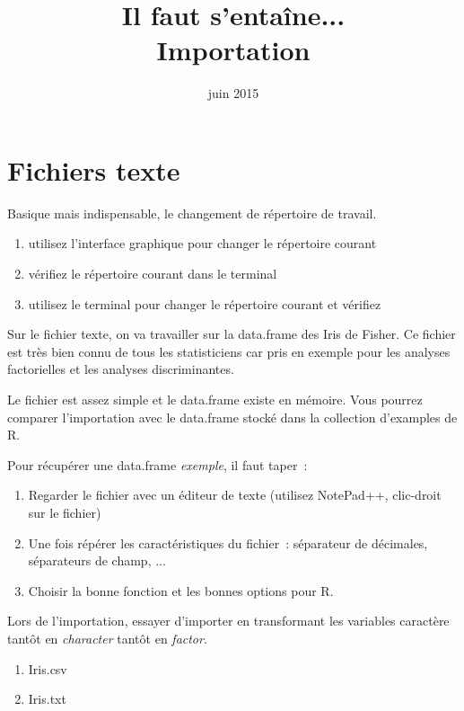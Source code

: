 \documentclass[a4paper,11pt,twoside]{article}\usepackage[]{graphicx}\usepackage[]{color}
\title{\Huge{Il faut s'ent\R aîne\R...}\\ \large{Importation}}
\date{juin 2015}
\begin{document}
\maketitle

\section{Fichiers texte}

  Basique mais indispensable, le changement de répertoire de travail.

  \begin{enumerate}
    \item utilisez l’interface graphique pour changer le répertoire courant
    \item vérifiez le répertoire courant dans le terminal
    \item utilisez le terminal pour changer le répertoire courant et vérifiez
  \end{enumerate}
  
  Sur le fichier texte, on va travailler sur la data.frame des Iris de Fisher. Ce fichier est très bien connu de tous les statisticiens car pris en exemple pour les analyses factorielles et les analyses discriminantes. 
  
  Le fichier est assez simple et le data.frame existe en mémoire. Vous pourrez comparer l'importation avec le data.frame stocké dans la collection d'examples de R.
  
  Pour récupérer une data.frame \emph{exemple}, il faut taper~:
  


  \begin{enumerate}
	\item Regarder le fichier avec un éditeur de texte (utilisez NotePad++, clic-droit sur le fichier)
	\item Une fois répérer les caractéristiques du fichier~: séparateur de décimales, séparateurs de champ, ...
	\item Choisir la bonne fonction et les bonnes options pour R.
\end{enumerate}

  Lors de l'importation, essayer d'importer en transformant les variables caractère tantôt en \emph{character} tantôt en \emph{factor}.

  \begin{enumerate}
    \item Iris.csv
    

    
    \item Iris.txt
    

    
  \end{enumerate}
\end{document}
